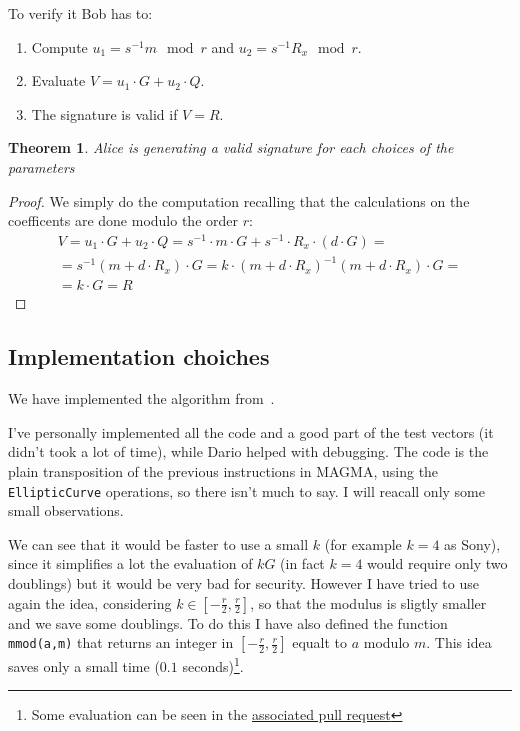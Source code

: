 \documentclass{article}
\theoremstyle{plain}
\newtheorem{teo}{Theorem}[section]
\theoremstyle{remark}
\theoremstyle{definition}
\begin{document}
To verify it Bob has to:
\begin{enumerate}
	\item Compute $u_1 = s^{-1} m \mod r$ and $u_2 = s^{-1} R_x  \mod r$.
	\item Evaluate $V = u_1 \cdot G + u_2 \cdot Q$. 
	\item The signature is valid if $V = R$.
\end{enumerate}

\begin{teo}
	Alice is generating a valid signature for each choices of the parameters
\end{teo}
\begin{proof}
	We simply do the computation recalling that the calculations on the coefficents are done modulo the order $r$:
	\begin{multline*}
		V = u_1 \cdot G + u_2 \cdot Q = s^{-1} \cdot m \cdot G + s^{-1} \cdot R_x \cdot (d \cdot G) = \\
		= s^{-1} (m + d\cdot R_x) \cdot G = k\cdot (m + d\cdot R_x)^{-1} (m + d\cdot R_x) \cdot G = \\
		= k \cdot G = R
	\end{multline*}
\end{proof}


\subsection{Implementation choiches}

We have implemented the algorithm from~\cite[Section 6.6]{washington}.

I've personally implemented all the code and a good part of the test vectors (it didn't took a lot of time), while Dario helped with debugging. The code is the plain transposition of the previous instructions in MAGMA, using the \texttt{EllipticCurve} operations, so there isn't much to say. I will reacall only some small observations.

We can see that it would be faster to use a small $k$ (for example $k = 4$ as Sony), since it simplifies a lot the evaluation of $kG$ (in fact $k=4$ would require only two doublings) but it would be very bad for security. 
However I have tried to use again the idea, considering $k \in [-\frac{r}{2}, \frac{r}{2}]$, so that the modulus is sligtly smaller and we save some doublings. To do this I have also defined the function \texttt{mmod(a,m)} that returns an integer in $[-\frac{r}{2}, \frac{r}{2}]$ equalt to $a$ modulo $m$. This idea saves only a small time ($0.1$ seconds)\footnote{Some evaluation can be seen in the \href{https://github.com/giacomoborin/project2_MAGMA/pull/36}{associated pull request}}.
\end{document}

